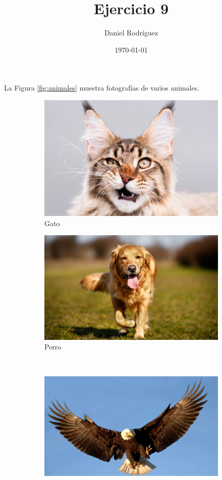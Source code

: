 \documentclass{article}
\title{Ejercicio 9}
\author{Daniel Rodríguez}
\date{\today}
\begin{document}
\maketitle
  La Figura \ref{fig:animales} muestra fotografías de varios animales.
  \begin{figure}[h!]
    \centering
    \begin{subfigure}[b]{0.4\textwidth}
      \centering
      \includegraphics[height=0.5\linewidth]{../gato}
      \caption{Gato}
      \label{fig:gato}
    \end{subfigure}
    \begin{subfigure}[b]{0.4\textwidth}
      \centering
      \includegraphics[height=0.5\linewidth]{../perro}
      \caption{Perro}
      \label{fig:perro}
    \end{subfigure} \\ [1ex]
    \begin{subfigure}[b]{0.4\textwidth}
      \centering
      \includegraphics[height=0.5\linewidth]{../aguila}

\end{subfigure}
\end{figure}
\end{document}
